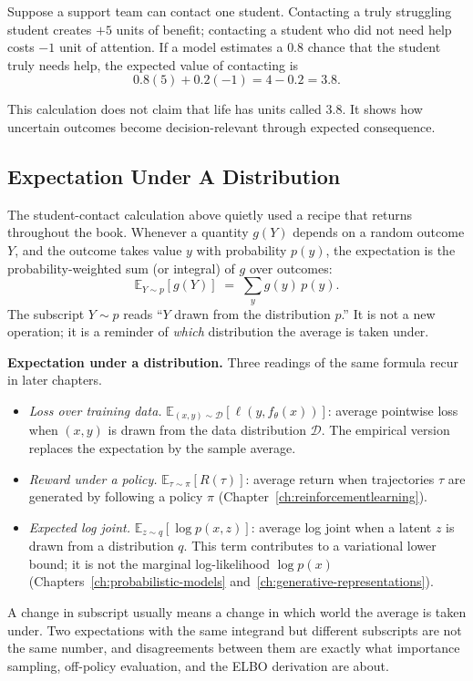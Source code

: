 Suppose a support team can contact one student. Contacting a truly struggling student creates \(+5\) units of benefit; contacting a student who did not need help costs \(-1\) unit of attention. If a model estimates a \(0.8\) chance that the student truly needs help, the expected value of contacting is
\[
0.8(5) + 0.2(-1) = 4 - 0.2 = 3.8.
\]

This calculation does not claim that life has units called \(3.8\). It shows how uncertain outcomes become decision-relevant through expected consequence.

\subsection*{Expectation Under A Distribution}

The student-contact calculation above quietly used a recipe that returns throughout the book. Whenever a quantity \(g(Y)\) depends on a random outcome \(Y\), and the outcome takes value \(y\) with probability \(p(y)\), the expectation is the probability-weighted sum (or integral) of \(g\) over outcomes:
\[
\mathbb{E}_{Y \sim p}[g(Y)] \;=\; \sum_y g(y)\,p(y).
\]
The subscript \(Y \sim p\) reads ``\(Y\) drawn from the distribution \(p\).'' It is not a new operation; it is a reminder of \emph{which} distribution the average is taken under.

\textbf{Expectation under a distribution.} Three readings of the same formula recur in later chapters.
\begin{itemize}[leftmargin=*]
\item \emph{Loss over training data.} $\mathbb{E}_{(x,y) \sim \mathcal{D}}[\ell(y, f_\theta(x))]$: average pointwise loss when $(x,y)$ is drawn from the data distribution $\mathcal{D}$. The empirical version replaces the expectation by the sample average.
\item \emph{Reward under a policy.} $\mathbb{E}_{\tau \sim \pi}[R(\tau)]$: average return when trajectories $\tau$ are generated by following a policy $\pi$ (Chapter~\ref{ch:reinforcementlearning}).
\item \emph{Expected log joint.} $\mathbb{E}_{z \sim q}[\log p(x, z)]$: average log joint when a latent $z$ is drawn from a distribution $q$. This term contributes to a variational lower bound; it is not the marginal log-likelihood $\log p(x)$ (Chapters~\ref{ch:probabilistic-models} and~\ref{ch:generative-representations}).
\end{itemize}
A change in subscript usually means a change in which world the average is taken under. Two expectations with the same integrand but different subscripts are not the same number, and disagreements between them are exactly what importance sampling, off-policy evaluation, and the ELBO derivation are about.

